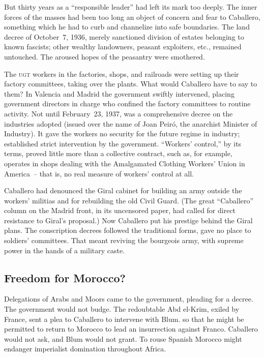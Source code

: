 But thirty years as a ``responsible leader'' had left its mark too deeply. The inner forces of the masses had been too long an object of concern and fear to Caballero, something which he had to curb and channelize into safe boundaries. The land decree of October~7, 1936, merely sanctioned division of estates belonging to known fascists; other wealthy landowners, peasant exploiters, etc., remained untouched. The aroused hopes of the peasantry were smothered.

The \textsc{ugt} workers in the factories, shops, and railroads were setting up their factory committees, taking over the plants. What would Caba\-llero have to say to them? In Valencia and Madrid the government swiftly intervened, placing government directors in charge who confined the factory committees to routine activity. Not until February~23, 1937, was a comprehensive decree on the industries adopted (issued over the name of Joan Peir\'o, the anarchist Minister of Industry). It gave the workers no security for the future regime in industry; established strict intervention by the government. ``Workers’ control,'' by its terms, proved little more than a collective contract, such as, for example, operates in shops dealing with the Amalgamated Clothing Workers’ Union in America~-- that is, no real measure of workers’ control at all.

Caballero had denounced the Giral cabinet for building an army outside the workers’ militias and for rebuilding the old Civil Guard. (The great ``Caballero'' column on the Madrid front, in its uncensored paper, had called for direct resistance to Giral’s proposal.) Now Caba\-llero put his prestige behind the Giral plans. The conscription decrees followed the traditional forms, gave no place to soldiers’ committees. That meant reviving the bourgeois army, with supreme power in the hands of a military caste.

\subsection*{Freedom for Morocco?}

Delegations of Arabs and Moors came to the government, pleading for a decree. The government would not budge. The redoubtable Abd el-Krim, exiled by France, sent a plea to Caballero to intervene with Blum. so that he might be permitted to return to Morocco to lead an insurrection against Franco. Caballero would not ask, and Blum would not grant. To rouse Spanish Morocco might endanger imperialist domination throughout Africa.

